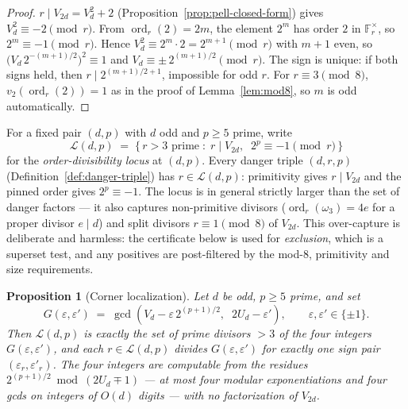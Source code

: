 \documentclass[11pt]{amsart}
\theoremstyle{plain}
\newtheorem{proposition}[theorem]{Proposition}
\theoremstyle{definition}
\theoremstyle{remark}
\numberwithin{equation}{section}
\newcommand{\ord}{\operatorname{ord}}
\newcommand{\F}{\mathbb{F}}
\begin{document}
\begin{proof}
$r \mid V_{2 d} = V_d^2 + 2$ (Proposition~\ref{prop:pell-closed-form}) gives $V_d^2 \equiv -2 \pmod r$. From $\ord_r(2) = 2 m$, the element $2^m$ has order $2$ in $\F_r^\times$, so $2^m \equiv -1 \pmod r$. Hence $V_d^2 \equiv 2^m \cdot 2 = 2^{m+1} \pmod r$ with $m + 1$ even, so $\bigl(V_d \, 2^{-(m+1)/2}\bigr)^2 \equiv 1$ and $V_d \equiv \pm\, 2^{(m+1)/2} \pmod r$. The sign is unique: if both signs held, then $r \mid 2^{(m+1)/2 + 1}$, impossible for odd $r$. For $r \equiv 3 \pmod 8$, $v_2(\ord_r(2)) = 1$ as in the proof of Lemma~\ref{lem:mod8}, so $m$ is odd automatically.
\end{proof}

For a fixed pair $(d, p)$ with $d$ odd and $p \geq 5$ prime, write
\[
  \mathcal{L}(d, p) \;=\; \{\, r > 3 \text{ prime} \;:\; r \mid V_{2 d},\;\; 2^p \equiv -1 \pmod r \,\}
\]
for the \emph{order-divisibility locus} at $(d, p)$. Every danger triple $(d, r, p)$ (Definition~\ref{def:danger-triple}) has $r \in \mathcal{L}(d, p)$: primitivity gives $r \mid V_{2 d}$ and the pinned order gives $2^p \equiv -1$. The locus is in general strictly larger than the set of danger factors --- it also captures non-primitive divisors ($\ord_r(\omega_3) = 4 e$ for a proper divisor $e \mid d$) and split divisors $r \equiv 1 \pmod 8$ of $V_{2 d}$. This over-capture is deliberate and harmless: the certificate below is used for \emph{exclusion}, which is a superset test, and any positives are post-filtered by the mod-$8$, primitivity and size requirements.

\begin{proposition}[Corner localization]\label{prop:corner-localization}
Let $d$ be odd, $p \geq 5$ prime, and set
\[
  G(\varepsilon, \varepsilon') \;=\; \gcd\!\left(V_d - \varepsilon\, 2^{(p+1)/2},\;\; 2 U_d - \varepsilon'\right), \qquad \varepsilon, \varepsilon' \in \{\pm 1\}.
\]
Then $\mathcal{L}(d, p)$ is exactly the set of prime divisors $> 3$ of the four integers $G(\varepsilon, \varepsilon')$, and each $r \in \mathcal{L}(d, p)$ divides $G(\varepsilon, \varepsilon')$ for exactly one sign pair $(\varepsilon_r, \varepsilon'_r)$. The four integers are computable from the residues $2^{(p+1)/2} \bmod (2 U_d \mp 1)$ --- at most four modular exponentiations and four gcds on integers of $O(d)$ digits --- with no factorization of $V_{2 d}$.
\end{proposition}
\end{document}
